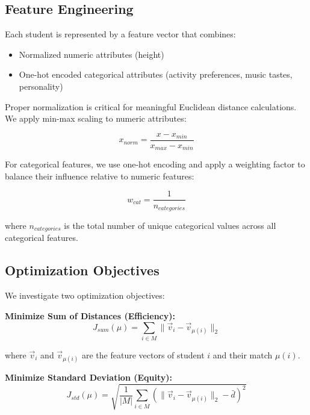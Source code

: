 \documentclass[10pt,journal,compsoc]{IEEEtran}
\begin{document}
\subsection{Feature Engineering}

Each student is represented by a feature vector that combines:

\begin{itemize}
\item Normalized numeric attributes (height)
\item One-hot encoded categorical attributes (activity preferences, music tastes, personality)
\end{itemize}

Proper normalization is critical for meaningful Euclidean distance calculations. We apply min-max scaling to numeric attributes:

\begin{equation}
x_{norm} = \frac{x - x_{min}}{x_{max} - x_{min}}
\end{equation}

For categorical features, we use one-hot encoding and apply a weighting factor to balance their influence relative to numeric features:

\begin{equation}
w_{cat} = \frac{1}{n_{categories}}
\end{equation}

where $n_{categories}$ is the total number of unique categorical values across all categorical features.

\subsection{Optimization Objectives}

We investigate two optimization objectives:

\textbf{Minimize Sum of Distances (Efficiency):}
\begin{equation}
J_{sum}(\mu) = \sum_{i \in M} \| \vec{v}_i - \vec{v}_{\mu(i)} \|_2
\end{equation}

where $\vec{v}_i$ and $\vec{v}_{\mu(i)}$ are the feature vectors of student $i$ and their match $\mu(i)$.

\textbf{Minimize Standard Deviation (Equity):}
\begin{equation}
J_{std}(\mu) = \sqrt{\frac{1}{|M|} \sum_{i \in M} \left( \| \vec{v}_i - \vec{v}_{\mu(i)} \|_2 - \bar{d} \right)^2}
\end{equation}
\end{document}
